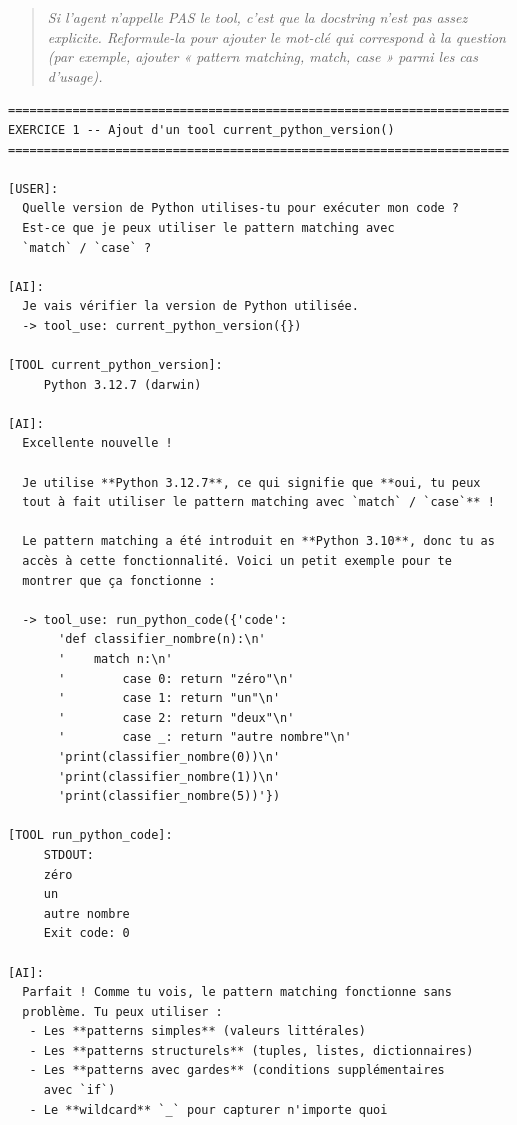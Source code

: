 \documentclass[11pt,a4paper]{article}
\begin{document}
\begin{quote}\itshape
Si l'agent n'appelle PAS le tool, c'est que la docstring n'est pas
assez explicite. Reformule-la pour ajouter le mot-clé qui correspond à
la question (par exemple, ajouter « pattern matching, match, case »
parmi les cas d'usage).
\end{quote}

\begin{tcolorbox}[
  colback=white,
  colframe=black!50,
  coltitle=black,
  fonttitle=\footnotesize\bfseries,
  fontupper=\footnotesize,
  title=Sortie de l'exécution,
  breakable,
]
\begin{verbatim}
======================================================================
EXERCICE 1 -- Ajout d'un tool current_python_version()
======================================================================

[USER]:
  Quelle version de Python utilises-tu pour exécuter mon code ?
  Est-ce que je peux utiliser le pattern matching avec
  `match` / `case` ?

[AI]:
  Je vais vérifier la version de Python utilisée.
  -> tool_use: current_python_version({})

[TOOL current_python_version]:
     Python 3.12.7 (darwin)

[AI]:
  Excellente nouvelle !

  Je utilise **Python 3.12.7**, ce qui signifie que **oui, tu peux
  tout à fait utiliser le pattern matching avec `match` / `case`** !

  Le pattern matching a été introduit en **Python 3.10**, donc tu as
  accès à cette fonctionnalité. Voici un petit exemple pour te
  montrer que ça fonctionne :

  -> tool_use: run_python_code({'code':
       'def classifier_nombre(n):\n'
       '    match n:\n'
       '        case 0: return "zéro"\n'
       '        case 1: return "un"\n'
       '        case 2: return "deux"\n'
       '        case _: return "autre nombre"\n'
       'print(classifier_nombre(0))\n'
       'print(classifier_nombre(1))\n'
       'print(classifier_nombre(5))'})

[TOOL run_python_code]:
     STDOUT:
     zéro
     un
     autre nombre
     Exit code: 0

[AI]:
  Parfait ! Comme tu vois, le pattern matching fonctionne sans
  problème. Tu peux utiliser :
   - Les **patterns simples** (valeurs littérales)
   - Les **patterns structurels** (tuples, listes, dictionnaires)
   - Les **patterns avec gardes** (conditions supplémentaires
     avec `if`)
   - Le **wildcard** `_` pour capturer n'importe quoi
\end{verbatim}
\end{tcolorbox}
\end{document}
